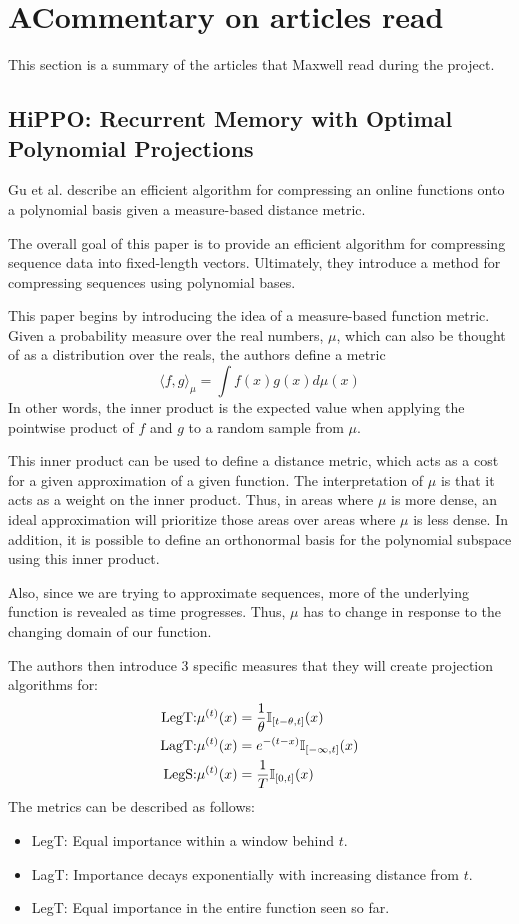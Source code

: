 \section*{A\quad Commentary on articles read}
This section is a summary of the articles that Maxwell read during the project.

\subsection{HiPPO: Recurrent Memory with Optimal Polynomial Projections}
Gu et al. describe an efficient algorithm for compressing an online functions
onto a polynomial basis given a measure-based distance metric\cite{hippo}.

The overall goal of this paper is to provide an efficient algorithm for
compressing sequence data into fixed-length vectors.
Ultimately, they introduce a method for compressing sequences using polynomial
bases.

This paper begins by introducing the idea of a measure-based function metric.
Given a probability measure over the real numbers, $\mu$, which can also be
thought of as a distribution over the reals, the authors define a metric
$$\langle f, g\rangle_\mu = \int f(x)g(x) d\mu(x)$$
In other words, the inner product is the expected value when applying the
pointwise product of $f$ and $g$ to a random sample from $\mu$.

This inner product can be used to define a distance metric, which acts as a
cost for a given approximation of a given function.
The interpretation of $\mu$ is that it acts as a weight on the inner product.
Thus, in areas where $\mu$ is more dense, an ideal approximation will prioritize
those areas over areas where $\mu$ is less dense.
In addition, it is possible to define an orthonormal basis for the polynomial
subspace using this inner product.

Also, since we are trying to approximate sequences, more of the underlying function is
revealed as time progresses. Thus, $\mu$ has to change in response to the
changing domain of our function.

The authors then introduce 3 specific measures that they will create projection
algorithms for:
\begin{align*}
    \text{LegT:}& \mu^{(t)}(x) = \frac{1}{\theta}{\mathbb I}_{[t - \theta, t]}(x)\\
    \text{LagT:}& \mu^{(t)}(x) = e^{-(t-x)}{\mathbb I}_{[-\infty, t]}(x)\\
    \text{LegS:}& \mu^{(t)}(x) = \frac{1}{T}{\mathbb I}_{[0, t]}(x)\\
\end{align*}
The metrics can be described as follows:
\begin{itemize}
    \item LegT: Equal importance within a window behind $t$.
    \item LagT: Importance decays exponentially with increasing distance from
        $t$.
    \item LegT: Equal importance in the entire function seen so far.
\end{itemize}

